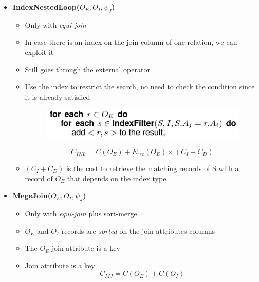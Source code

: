 \begin{itemize}
    
    \item \textbf{IndexNestedLoop($O_E, O_I, \psi_J$)}
    \begin{itemize}
        \item Only with \textit{equi-join}
        \item In case there is an index on the join column of one relation, we can exploit it
        \item Still goes through the external operator
        \item Use the index to restrict the search, no need to check the condition since it is already satisfied
        \begin{figure}[h]
        \centering
        \includegraphics[width=.5\linewidth]{images/DBMS_Internals/ImplementationOfRelationalOperator/IndexNestedLoop.jpeg}
        \end{figure}
        $$C_{INL} = C(O_E) + E_{rec}(O_E) \times (C_I + C_D)$$
        \item $(C_I + C_D)$ is the cost to retrieve the matching records of S with a record of $O_E$ that depends on the index type
    \end{itemize}

    \item \textbf{MegeJoin($O_E, O_I, \psi_J$)}
    \begin{itemize}
        \item Only with \textit{equi-join} plus sort-merge
        \item $O_E$ and $O_I$ records are \textit{sorted} on the join attributes columns
        \item The $O_E$ join attribute is a key
        \item Join attribute is a key
        $$C_{MJ} = C(O_E) + C(O_I)$$
    \end{itemize}
    

\end{itemize}
